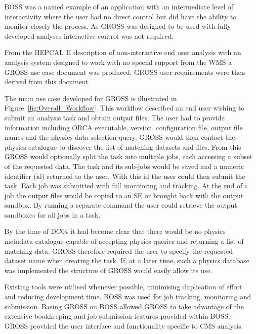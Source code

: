 BOSS was a named example of an application with an intermediate level of interactivity where the user had no direct control but did have the ability to monitor closely the process. As GROSS was designed to be used with fully developed analyses interactive control was not required.

From the HEPCAL II description of non-interactive end user analysis with an analysis system designed to work with no special support from the WMS a GROSS use case document was produced. GROSS user requirements were then derived from this document.

The main use case developed for GROSS is illustrated in Figure~\ref{fig:Overall_Workflow}. This workflow described an end user wishing to submit an analysis task and obtain output files. The user had to provide information including ORCA executable, version, configuration file, output file names and the physics data selection query. GROSS would then contact the physics catalogue to discover the list of matching datasets and files. From this GROSS would optionally split the task into multiple jobs, each accessing a subset of the requested data. The task and its sub-jobs would be saved and a numeric identifier (id) returned to the user. With this id the user could then submit the task. Each job was submitted with full monitoring and tracking. At the end of a job the output files would be copied to an SE or brought back with the output sandbox. By running a separate command the user could retrieve the output sandboxes for all jobs in a task.

By the time of DC04 it had become clear that there would be no physics metadata catalogue capable of accepting physics queries and returning a list of matching data. GROSS therefore required the user to specify the requested dataset name when creating the task. If, at a later time, such a physics database was implemented the structure of GROSS would easily allow its use.

Existing tools were utilised whenever possible, minimising duplication of effort and reducing development time. BOSS was used for job tracking, monitoring and submission. Basing GROSS on BOSS allowed GROSS to take advantage of the extensive bookkeeping and job submission features provided within BOSS. GROSS provided the user interface and functionality specific to CMS analysis. 

